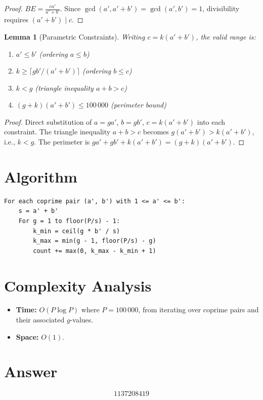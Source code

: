 \documentclass[12pt]{article}
\newtheorem{lemma}[theorem]{Lemma}
\begin{document}
\begin{proof}
$BE = \frac{ca'}{a'+b'}$. Since $\gcd(a', a'+b') = \gcd(a', b') = 1$, divisibility requires $(a'+b') \mid c$.
\end{proof}

\begin{lemma}[Parametric Constraints]
Writing $c = k(a'+b')$, the valid range is:
\begin{enumerate}
\item $a' \leq b'$ (ordering $a \leq b$)
\item $k \geq \lceil gb'/(a'+b') \rceil$ (ordering $b \leq c$)
\item $k < g$ (triangle inequality $a + b > c$)
\item $(g+k)(a'+b') \leq 100\,000$ (perimeter bound)
\end{enumerate}
\end{lemma}

\begin{proof}
Direct substitution of $a = ga'$, $b = gb'$, $c = k(a'+b')$ into each constraint. The triangle inequality $a + b > c$ becomes $g(a'+b') > k(a'+b')$, i.e., $k < g$. The perimeter is $ga' + gb' + k(a'+b') = (g+k)(a'+b')$.
\end{proof}

\section{Algorithm}

\begin{verbatim}
For each coprime pair (a', b') with 1 <= a' <= b':
    s = a' + b'
    For g = 1 to floor(P/s) - 1:
        k_min = ceil(g * b' / s)
        k_max = min(g - 1, floor(P/s) - g)
        count += max(0, k_max - k_min + 1)
\end{verbatim}

\section{Complexity Analysis}
\begin{itemize}
\item \textbf{Time:} $O(P \log P)$ where $P = 100\,000$, from iterating over coprime pairs and their associated $g$-values.
\item \textbf{Space:} $O(1)$.
\end{itemize}

\section{Answer}

\[
\boxed{1137208419}
\]
\end{document}

